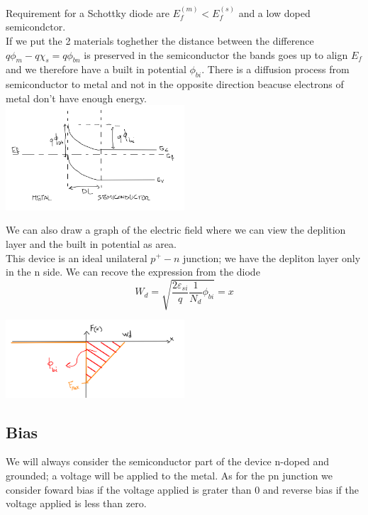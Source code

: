 Requirement for a Schottky diode are $E_f^{(m)}<E_f^{(s)}$ and a low doped semicondctor.\\
If we put the 2 materials toghether the distance between the difference $q\phi_m-q\chi_s=q\phi_{bn}$ is preserved in the semiconductor the bands goes up to align $E_f$ and we therefore have a built in potential $\phi_{bi}$. There is a diffusion process from semiconductor to metal and not in the opposite direction beacuse electrons of metal don't have enough energy.\\

\centering
\includegraphics[width=0.5\textwidth]{ms2.png}\\
\raggedright

We can also draw a graph of the electric field where we can view the deplition layer and the built in potential as area.\\
This device is an ideal unilateral $p^+-n$ junction; we have the depliton layer only in the n side. We can recove the expression from the diode   
\begin{equation}
W_d=\sqrt{\frac{2\varepsilon_{si}}{q}\frac{1}{N_d}\phi_{bi}}=x
\end{equation}  

\centering
\includegraphics[width=0.5\textwidth]{ms3.png}\\
\raggedright

\subsection{Bias}
We will always consider the semiconductor part of the device n-doped and grounded; a voltage will be applied to the metal. As for the pn junction we consider foward bias if the voltage applied is grater than 0 and reverse bias if the voltage applied is less than zero.\\


